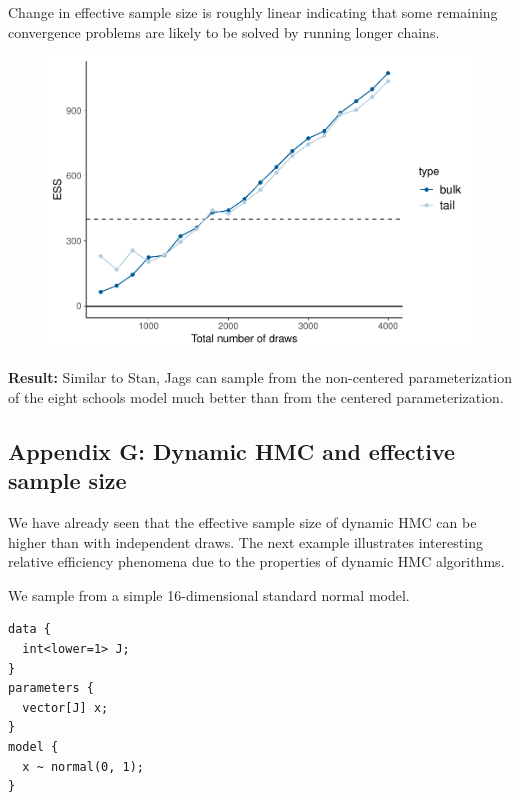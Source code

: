 \documentclass[american,]{article}
\begin{document}
Change in effective sample size is roughly linear indicating that some
remaining convergence problems are likely to be solved by running longer
chains.

\begin{figure}[tp]
  \centering
  \includegraphics[width=0.6\linewidth]{graphics/change-ess-jags-ncp-tau-1.pdf}
\end{figure}

\textbf{Result:} Similar to Stan, Jags can sample from the non-centered
parameterization of the eight schools model much better than from the
centered parameterization.

\hypertarget{AppendixG}{%
\subsection*{Appendix G: Dynamic HMC and effective sample
size}\label{AppendixG}}

We have already seen that the effective sample size of dynamic HMC can
be higher than with independent draws. The next example illustrates
interesting relative efficiency phenomena due to the properties of
dynamic HMC algorithms.

We sample from a simple 16-dimensional standard normal model.

\begin{verbatim}
data {
  int<lower=1> J;
}
parameters {
  vector[J] x;
}
model {
  x ~ normal(0, 1);
}
\end{verbatim}
\end{document}
